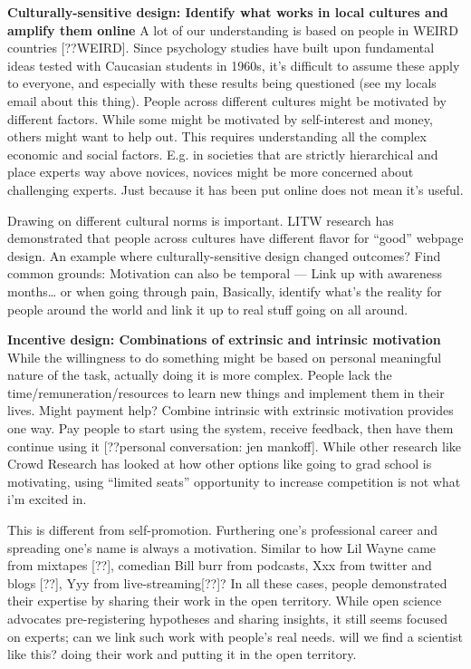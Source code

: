 \textbf{Culturally-sensitive design: Identify what works in local cultures and amplify them online}
A lot of our understanding is based on people in WEIRD countries [??WEIRD]. Since psychology studies have built upon fundamental ideas tested with Caucasian students in 1960s, it’s difficult to assume these apply to everyone, and especially with these results being questioned (see my locals email about this thing). People across different cultures might be motivated by different factors. While some might be motivated by self-interest and money, others might want to help out.  This requires understanding all the complex economic and social factors. E.g. in societies that are strictly hierarchical and place experts way above novices, novices might be more concerned about challenging experts. Just because it has been put online does not mean it’s useful. 

Drawing on different cultural norms is important. LITW research has demonstrated that people across cultures have different flavor for “good” webpage design. An example where culturally-sensitive design changed outcomes?
Find common grounds: Motivation can also be temporal — Link up with awareness months… or when going through pain, Basically, identify what’s the reality for people around the world and link it up to real stuff going on all around. 

\textbf{Incentive design: Combinations of extrinsic and intrinsic motivation}
While the willingness to do something might be based on personal meaningful nature of the task, actually doing it is more complex. People lack the time/remuneration/resources to learn new things and implement them in their lives. Might payment help? Combine intrinsic with extrinsic motivation provides one way. Pay people to start using the system, receive feedback, then have them continue using it [??personal conversation: jen mankoff]. While other research like Crowd Research has looked at how other options like going to grad school is motivating, using “limited seats” opportunity to increase competition is not what i’m excited in. 

This is different from self-promotion. Furthering one’s professional career and spreading one’s name is always a motivation. Similar to how Lil Wayne came from mixtapes [??], comedian Bill burr from podcasts, Xxx from twitter and blogs [??], Yyy from live-streaming[??]? In all these cases, people demonstrated their expertise by sharing their work in the open territory. While open science advocates pre-registering hypotheses and sharing insights, it still seems focused on experts; can we link such work with people’s real needs. will we find a scientist like this? doing their work and putting it in the open territory.

